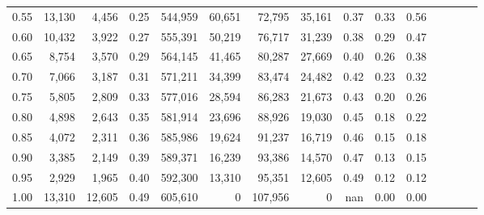 \begin{tabular}{rrrcrrrrrrrrrrr}
0.55 &  13,130 &   4,456 &                                       0.25 &  544,959 &   60,651 &   72,795 &   35,161 &  0.37 &  0.33 &                         0.56 \\
0.60 &  10,432 &   3,922 &                                       0.27 &  555,391 &   50,219 &   76,717 &   31,239 &  0.38 &  0.29 &                         0.47 \\
0.65 &   8,754 &   3,570 &                                       0.29 &  564,145 &   41,465 &   80,287 &   27,669 &  0.40 &  0.26 &                         0.38 \\
0.70 &   7,066 &   3,187 &                                       0.31 &  571,211 &   34,399 &   83,474 &   24,482 &  0.42 &  0.23 &                         0.32 \\
0.75 &   5,805 &   2,809 &                                       0.33 &  577,016 &   28,594 &   86,283 &   21,673 &  0.43 &  0.20 &                         0.26 \\
0.80 &   4,898 &   2,643 &                                       0.35 &  581,914 &   23,696 &   88,926 &   19,030 &  0.45 &  0.18 &                         0.22 \\
0.85 &   4,072 &   2,311 &                                       0.36 &  585,986 &   19,624 &   91,237 &   16,719 &  0.46 &  0.15 &                         0.18 \\
0.90 &   3,385 &   2,149 &                                       0.39 &  589,371 &   16,239 &   93,386 &   14,570 &  0.47 &  0.13 &                         0.15 \\
0.95 &   2,929 &   1,965 &                                       0.40 &  592,300 &   13,310 &   95,351 &   12,605 &  0.49 &  0.12 &                         0.12 \\
1.00 &  13,310 &  12,605 &                                       0.49 &  605,610 &        0 &  107,956 &        0 &   nan &  0.00 &                         0.00 \\
\bottomrule
\end{tabular}

